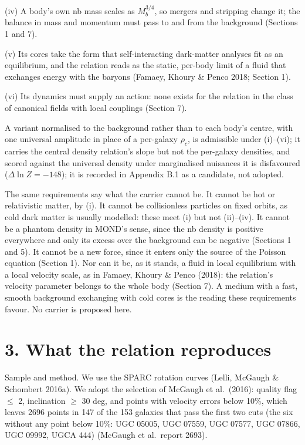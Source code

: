 \documentclass[
  10pt,
]{article}
\begin{document}
(iv) A body's own nb mass scales as $M_b^{3/4}$, so mergers and stripping change it; the balance in mass and momentum must pass to and from the background (Sections 1 and 7).

(v) Its cores take the form that self-interacting dark-matter analyses fit as an equilibrium, and the relation reads as the static, per-body limit of a fluid that exchanges energy with the baryons (Famaey, Khoury \& Penco 2018; Section 1).

(vi) Its dynamics must supply an action: none exists for the relation in the class of canonical fields with local couplings (Section 7).

A variant normalised to the background rather than to each body's centre, with one universal amplitude in place of a per-galaxy $\rho_c$, is admissible under (i)--(vi); it carries the central density relation's slope but not the per-galaxy densities, and scored against the universal density under marginalised nuisances it is disfavoured ($\Delta\ln Z=-148$); it is recorded in Appendix B.1 as a candidate, not adopted.

The same requirements say what the carrier cannot be. It cannot be hot or relativistic matter, by (i). It cannot be collisionless particles on fixed orbits, as cold dark matter is usually modelled: these meet (i) but not (ii)--(iv). It cannot be a phantom density in MOND's sense, since the nb density is positive everywhere and only its excess over the background can be negative (Sections 1 and 5). It cannot be a new force, since it enters only the source of the Poisson equation (Section 1). Nor can it be, as it stands, a fluid in local equilibrium with a local velocity scale, as in Famaey, Khoury \& Penco (2018): the relation's velocity parameter belongs to the whole body (Section 7). A medium with a fast, smooth background exchanging with cold cores is the reading these requirements favour. No carrier is proposed here.

\section{3. What the relation reproduces}\label{what-the-law-reproduces}

Sample and method. We use the SPARC rotation curves (Lelli, McGaugh \& Schombert 2016a). We adopt the selection of McGaugh et al.~(2016): quality flag $\le$ 2, inclination $\ge$ 30 deg, and points with velocity errors below 10\%, which leaves 2696 points in 147 of the 153 galaxies that pass the first two cuts (the six without any point below 10\%: UGC 05005, UGC 07559, UGC 07577, UGC 07866, UGC 09992, UGCA 444) (McGaugh et al.\ report 2693).
\end{document}
